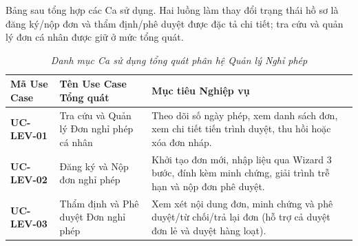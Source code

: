 Bảng sau tổng hợp các Ca sử dụng. Hai luồng làm thay đổi trạng thái hồ sơ là đăng ký/nộp đơn và thẩm định/phê duyệt được đặc tả chi tiết; tra cứu và quản lý đơn cá nhân được giữ ở mức tổng quát.

\begin{table}[H]
\centering
\caption[\textit{Danh mục Use Case tổng quát phân hệ Nghỉ phép}]{\textit{Danh mục Ca sử dụng tổng quát phân hệ Quản lý Nghỉ phép}}
\label{tab:mapping_uc_lev}
\vspace{0.15cm}
\begin{tabularx}{\textwidth}{|>{\RaggedRight\arraybackslash\small}p{2.8cm}|>{\RaggedRight\arraybackslash\small}p{4.2cm}|Y|}
\hline
\textbf{Mã Use Case} & \textbf{Tên Use Case Tổng quát} & \textbf{Mục tiêu Nghiệp vụ} \\
\hline
\textbf{UC-LEV-01} & Tra cứu và Quản lý Đơn nghỉ phép cá nhân & Theo dõi số ngày phép, xem danh sách đơn, xem chi tiết tiến trình duyệt, thu hồi hoặc xóa đơn nháp. \\
\hline
\textbf{UC-LEV-02} & Đăng ký và Nộp đơn nghỉ phép & Khởi tạo đơn mới, nhập liệu qua Wizard 3 bước, đính kèm minh chứng, giải trình trễ hạn và nộp đơn phê duyệt. \\
\hline
\textbf{UC-LEV-03} & Thẩm định và Phê duyệt Đơn nghỉ phép & Xem xét nội dung đơn, minh chứng và phê duyệt/từ chối/trả lại đơn (hỗ trợ cả duyệt đơn lẻ và duyệt hàng loạt). \\
\hline
\end{tabularx}
\end{table}

